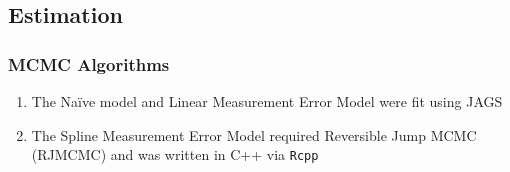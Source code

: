 \documentclass[handout]{beamer}\usepackage[]{graphicx}\usepackage[]{color}
\begin{document}
\subsection{Estimation}


\begin{frame}
\frametitle{MCMC Algorithms}

\begin{enumerate}
\item
The Na{\"i}ve model and Linear Measurement Error Model were fit using JAGS
\item
The Spline Measurement Error Model required Reversible Jump MCMC (RJMCMC) and was written in C++ via \texttt{Rcpp}
\end{enumerate}


\end{frame}
\end{document}
